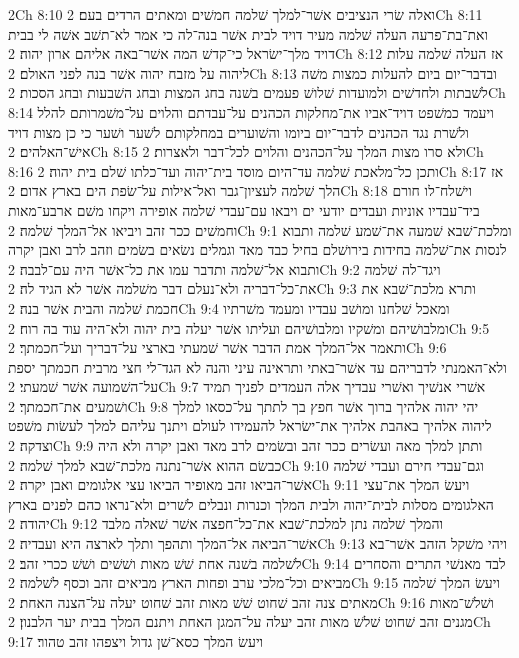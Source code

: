 2Ch 8:10  ואלה שׂרי הנציבים אשׁר־למלך שׁלמה חמשׁים ומאתים הרדים בעם׃
2Ch 8:11  ואת־בת־פרעה העלה שׁלמה מעיר דויד לבית אשׁר בנה־לה כי אמר לא־תשׁב אשׁה לי בבית דויד מלך־ישׂראל כי־קדשׁ המה אשׁר־באה אליהם ארון יהוה׃
2Ch 8:12  אז העלה שׁלמה עלות ליהוה על מזבח יהוה אשׁר בנה לפני האולם׃
2Ch 8:13  ובדבר־יום ביום להעלות כמצות משׁה לשׁבתות ולחדשׁים ולמועדות שׁלושׁ פעמים בשׁנה בחג המצות ובחג השׁבעות ובחג הסכות׃
2Ch 8:14  ויעמד כמשׁפט דויד־אביו את־מחלקות הכהנים על־עבדתם והלוים על־משׁמרותם להלל ולשׁרת נגד הכהנים לדבר־יום ביומו והשׁוערים במחלקותם לשׁער ושׁער כי כן מצות דויד אישׁ־האלהים׃
2Ch 8:15  ולא סרו מצות המלך על־הכהנים והלוים לכל־דבר ולאצרות׃
2Ch 8:16  ותכן כל־מלאכת שׁלמה עד־היום מוסד בית־יהוה ועד־כלתו שׁלם בית יהוה׃
2Ch 8:17  אז הלך שׁלמה לעציון־גבר ואל־אילות על־שׂפת הים בארץ אדום׃
2Ch 8:18  וישׁלח־לו חורם ביד־עבדיו אוניות ועבדים יודעי ים ויבאו עם־עבדי שׁלמה אופירה ויקחו משׁם ארבע־מאות וחמשׁים ככר זהב ויביאו אל־המלך שׁלמה׃
2Ch 9:1  ומלכת־שׁבא שׁמעה את־שׁמע שׁלמה ותבוא לנסות את־שׁלמה בחידות בירושׁלם בחיל כבד מאד וגמלים נשׂאים בשׂמים וזהב לרב ואבן יקרה ותבוא אל־שׁלמה ותדבר עמו את כל־אשׁר היה עם־לבבה׃
2Ch 9:2  ויגד־לה שׁלמה את־כל־דבריה ולא־נעלם דבר משׁלמה אשׁר לא הגיד לה׃
2Ch 9:3  ותרא מלכת־שׁבא את חכמת שׁלמה והבית אשׁר בנה׃
2Ch 9:4  ומאכל שׁלחנו ומושׁב עבדיו ומעמד משׁרתיו ומלבושׁיהם ומשׁקיו ומלבושׁיהם ועליתו אשׁר יעלה בית יהוה ולא־היה עוד בה רוח׃
2Ch 9:5  ותאמר אל־המלך אמת הדבר אשׁר שׁמעתי בארצי על־דבריך ועל־חכמתך׃
2Ch 9:6  ולא־האמנתי לדבריהם עד אשׁר־באתי ותראינה עיני והנה לא הגד־לי חצי מרבית חכמתך יספת על־השׁמועה אשׁר שׁמעתי׃
2Ch 9:7  אשׁרי אנשׁיך ואשׁרי עבדיך אלה העמדים לפניך תמיד ושׁמעים את־חכמתך׃
2Ch 9:8  יהי יהוה אלהיך ברוך אשׁר חפץ בך לתתך על־כסאו למלך ליהוה אלהיך באהבת אלהיך את־ישׂראל להעמידו לעולם ויתנך עליהם למלך לעשׂות משׁפט וצדקה׃
2Ch 9:9  ותתן למלך מאה ועשׂרים ככר זהב ובשׂמים לרב מאד ואבן יקרה ולא היה כבשׂם ההוא אשׁר־נתנה מלכת־שׁבא למלך שׁלמה׃
2Ch 9:10  וגם־עבדי חירם ועבדי שׁלמה אשׁר־הביאו זהב מאופיר הביאו עצי אלגומים ואבן יקרה׃
2Ch 9:11  ויעשׂ המלך את־עצי האלגומים מסלות לבית־יהוה ולבית המלך וכנרות ונבלים לשׁרים ולא־נראו כהם לפנים בארץ יהודה׃
2Ch 9:12  והמלך שׁלמה נתן למלכת־שׁבא את־כל־חפצה אשׁר שׁאלה מלבד אשׁר־הביאה אל־המלך ותהפך ותלך לארצה היא ועבדיה׃
2Ch 9:13  ויהי משׁקל הזהב אשׁר־בא לשׁלמה בשׁנה אחת שׁשׁ מאות ושׁשׁים ושׁשׁ ככרי זהב׃
2Ch 9:14  לבד מאנשׁי התרים והסחרים מביאים וכל־מלכי ערב ופחות הארץ מביאים זהב וכסף לשׁלמה׃
2Ch 9:15  ויעשׂ המלך שׁלמה מאתים צנה זהב שׁחוט שׁשׁ מאות זהב שׁחוט יעלה על־הצנה האחת׃
2Ch 9:16  ושׁלשׁ־מאות מגנים זהב שׁחוט שׁלשׁ מאות זהב יעלה על־המגן האחת ויתנם המלך בבית יער הלבנון׃
2Ch 9:17  ויעשׂ המלך כסא־שׁן גדול ויצפהו זהב טהור׃
